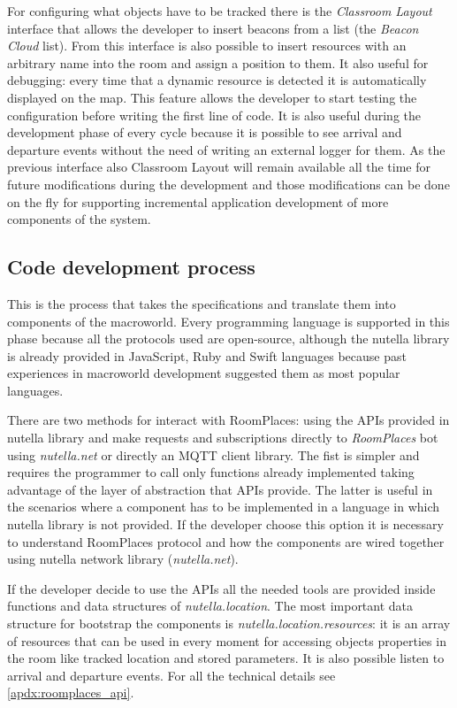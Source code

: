 For configuring what objects have to be tracked there is the \textit{Classroom Layout} interface that allows the developer to insert beacons from a list (the \textit{Beacon Cloud} list). From this interface is also possible to insert resources with an arbitrary name into the room and assign a position to them. It also useful for debugging: every time that a dynamic resource is detected it is automatically displayed on the map. This feature allows the developer to start testing the configuration before writing the first line of code. It is also useful during the development phase of every cycle because it is possible to see arrival and departure events without the need of writing an external logger for them. As the previous interface also Classroom Layout will remain available all the time for future modifications during the development and those modifications can be done on the fly for supporting incremental application development of more components of the system.

\subsection{Code development process}
This is the process that takes the specifications and translate them into components of the macroworld. Every programming language is supported in this phase because all the protocols used are open-source, although the nutella library is already provided in JavaScript, Ruby and Swift languages because past experiences in macroworld development suggested them as most popular languages.

There are two methods for interact with RoomPlaces: using the APIs provided in nutella library and make requests and subscriptions directly to \textit{RoomPlaces} bot using \textit{nutella.net} or directly an MQTT client library. The fist is simpler and requires the programmer to call only functions already implemented taking advantage of the layer of abstraction that APIs provide. The latter is useful in the scenarios where a component has to be implemented in a language in which nutella library is not provided. If the developer choose this option it is necessary to understand  RoomPlaces protocol and how the components are wired together using nutella network library (\textit{nutella.net}).

If the developer decide to use the APIs all the needed tools are provided inside functions and data structures of \textit{nutella.location}. The most important data structure for bootstrap the components is \textit{nutella.location.resources}: it is an array of resources that can be used in every moment for accessing objects properties in the room like tracked location and stored parameters. It is also possible listen to arrival and departure events. For all the technical details see \autoref{apdx:roomplaces_api}.

